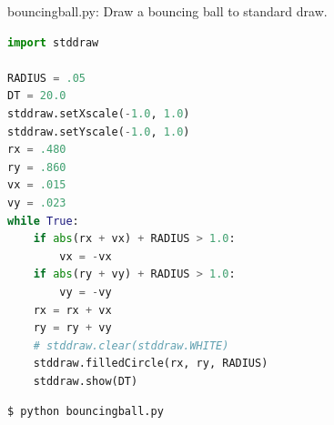 \documentclass[8pt,a4paper,compress]{beamer}
\begin{document}
\begin{frame}[fragile]
\pause

\begin{framed}
\tiny bouncingball.py: Draw a bouncing ball to standard draw.
\end{framed}

\begin{lstlisting}[language=Python]
import stddraw

RADIUS = .05
DT = 20.0
stddraw.setXscale(-1.0, 1.0)
stddraw.setYscale(-1.0, 1.0)
rx = .480
ry = .860
vx = .015
vy = .023
while True:
    if abs(rx + vx) + RADIUS > 1.0:
        vx = -vx
    if abs(ry + vy) + RADIUS > 1.0:
        vy = -vy
    rx = rx + vx
    ry = ry + vy
    # stddraw.clear(stddraw.WHITE)
    stddraw.filledCircle(rx, ry, RADIUS)
    stddraw.show(DT)
\end{lstlisting}

\pause

\begin{minipage}{150pt}
\begin{lstlisting}[language={}]
$ python bouncingball.py
\end{lstlisting}
\end{minipage}%
\begin{minipage}{150pt}
\hfill {}
\end{minipage}
\end{frame}
\end{document}

